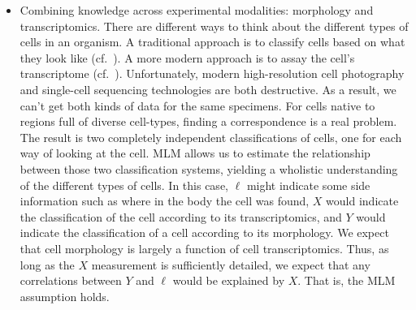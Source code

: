 \begin{itemize}
    \item Combining knowledge across experimental modalities: morphology and transcriptomics.  There are different ways to think about the different types of cells in an organism.  A traditional approach is to classify cells based on what they look like (cf.\ \cite{steinman1973identification,bloomfield1982physiological}).  A more modern approach is to assay the cell's transcriptome (cf.\ \citep{tasic2017shared}).  Unfortunately, modern high-resolution cell photography and single-cell sequencing technologies are both destructive.  As a result, we can't get both kinds of data for the same specimens.  For cells native to regions full of diverse cell-types, finding a correspondence is a real problem.  The result is two completely independent classifications of cells, one for each way of looking at the cell.  MLM allows us to estimate the relationship between those two classification systems, yielding a wholistic understanding of the different types of cells.  In this case, $\ell$ might indicate some side information such as where in the body the cell was found, $X$ would indicate the classification of the cell according to its transcriptomics, and $Y$ would indicate the classification of a cell according to its morphology.  We expect that cell morphology is largely a function of cell transcriptomics.  Thus, as long as the $X$ measurement is sufficiently detailed, we expect that any correlations between $Y$ and $\ell$ would be explained by $X$.  That is, the MLM assumption holds.  
 

\end{itemize}

